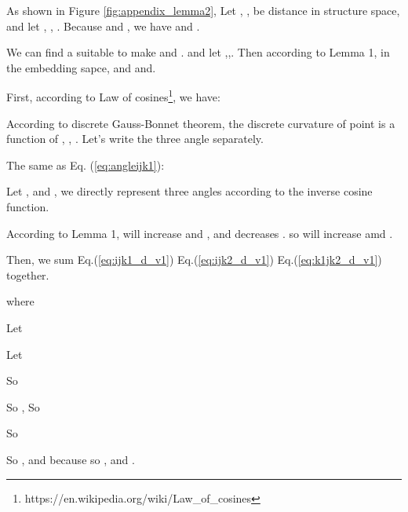 As shown in Figure \ref{fig:appendix_lemma2},  Let , ,  be distance in structure space,
and let , , . 
Because  and , we have  and . 


We can find a suitable  to make  and .
and let ,,.
Then according to Lemma 1, in the embedding sapce,  and  and.

First, according to Law of cosines\footnote{https://en.wikipedia.org/wiki/Law\_of\_cosines}, we have:



According to discrete Gauss-Bonnet theorem, the discrete curvature of point  is a function of , , . Let's write the three angle separately.















The same as Eq. (\ref{eq:angleijk1}):



Let , and , we directly represent three angles according to the inverse cosine function.




According to Lemma 1,  will increase  and , and decreases .
so   will increase  amd .

















Then, we sum Eq.(\ref{eq:ijk1_d_v1}) Eq.(\ref{eq:ijk2_d_v1}) Eq.(\ref{eq:k1jk2_d_v1}) together.




where 

Let 





Let 



So



So , So 

So


So , and 
because  so , and .








